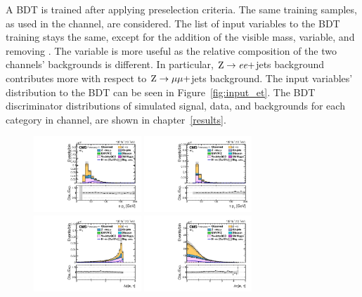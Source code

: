 A BDT is trained after applying preselection criteria. The same training samples, as used in the \muhad channel, are considered. The list of input variables to the BDT training stays the same, except for the addition of the visible mass, \mvis variable, and removing \ptvecmiss. The \mvis variable is more useful as the relative composition of the two channels' backgrounds is different. In particular, $\text{Z} \to \textit{e} \textit{e}+$jets background contributes more with respect to $\text{Z} \to \mu \mu+$jets background. The input variables' distribution to the BDT can be seen in Figure~\ref{fig:input_et}. The BDT discriminator distributions of simulated signal, data, and backgrounds for each category in \ehad channel, are shown in chapter~\ref{results}.

\begin{figure}[htbp!]
  \centering
  \includegraphics[width=0.36\textwidth]{plots/chapter6/etau/ePt.pdf}
  \includegraphics[width=0.36\textwidth]{plots/chapter6/etau/tPt.pdf}\\
  \includegraphics[width=0.36\textwidth]{plots/chapter6/etau/dPhiETau.pdf}
  \includegraphics[width=0.36\textwidth]{plots/chapter6/etau/dEtaETau.pdf}\\

\end{figure}
